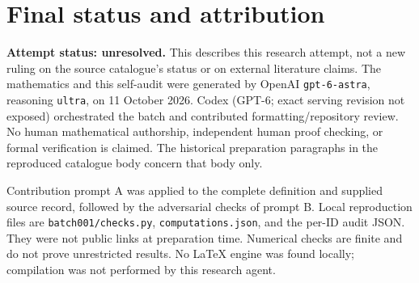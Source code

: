 \documentclass[11pt]{article}
\begin{document}
\section{Final status and attribution}
\textbf{Attempt status: unresolved.} This describes this research attempt, not a new ruling on the source catalogue's status or on external literature claims.
The mathematics and this self-audit were generated by OpenAI \texttt{gpt-6-astra}, reasoning \texttt{ultra}, on 11 October 2026. Codex (GPT-6; exact serving revision not exposed) orchestrated the batch and contributed formatting/repository review. No human mathematical authorship, independent human proof checking, or formal verification is claimed. The historical preparation paragraphs in the reproduced catalogue body concern that body only.

Contribution prompt A was applied to the complete definition and supplied source record, followed by the adversarial checks of prompt B. Local reproduction files are \texttt{batch001/checks.py}, \texttt{computations.json}, and the per-ID audit JSON. They were not public links at preparation time. Numerical checks are finite and do not prove unrestricted results. No LaTeX engine was found locally; compilation was not performed by this research agent.
\end{document}
